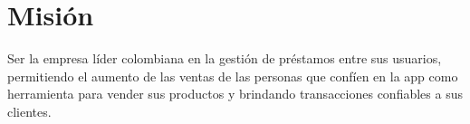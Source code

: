 \section{Misión}

{Ser la empresa líder colombiana en la gestión de préstamos entre sus usuarios, permitiendo el aumento de las ventas de las personas que confíen en la app como herramienta para vender sus productos y brindando transacciones confiables a sus clientes.}